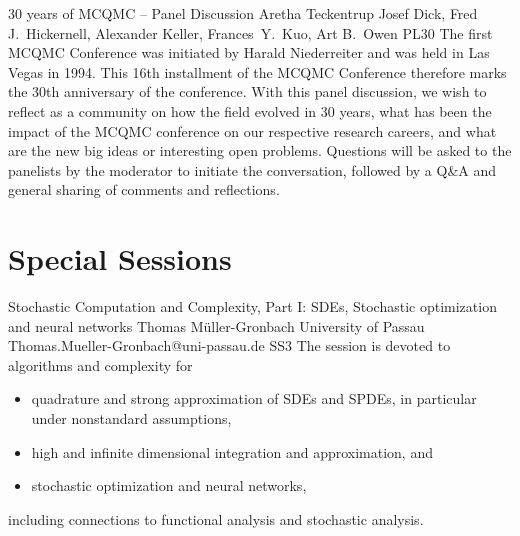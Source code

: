 \documentclass[12pt,a4paper,figuresright]{book}
\begin{document}
\begin{talkp}
    {30 years of MCQMC -- Panel Discussion}
    {Aretha Teckentrup}
    {Josef Dick, Fred J.~Hickernell, Alexander Keller, Frances~Y.~Kuo, Art B.~Owen}
    {}%
    {PL30}
    The first MCQMC Conference was initiated by Harald Niederreiter and was held in Las Vegas in 1994. This 16th installment of the MCQMC Conference therefore marks the 30th anniversary of the conference. With this panel discussion, we wish to reflect as a community on how the field evolved in 30 years, what has been the impact of the MCQMC conference on our respective research careers, and what are the new big ideas or interesting open problems. Questions will be asked to the panelists by the moderator to initiate the conversation, followed by a Q\&A and general sharing of comments and reflections. 
    
\end{talkp}

\chapter{Special Sessions}\newpage

\begin{session}
 {Stochastic Computation and Complexity, Part I: SDEs, Stochastic optimization and neural networks}%
 {Thomas M\"uller-Gronbach}%
 {University of Passau}%
 {Thomas.Mueller-Gronbach@uni-passau.de}%
 {}%
 {}%
 {}%
 {SS3}
 {}%
The session is devoted to algorithms and complexity for
\begin{itemize}[itemsep=0pt,topsep=0pt]
 \item quadrature and strong approximation of SDEs and SPDEs, in particular under nonstandard assumptions,

 \item high and infinite dimensional integration and approximation, and

 \item stochastic optimization and neural networks,
\end{itemize}
including connections to functional analysis and stochastic analysis.
\end{session}
\end{document}
